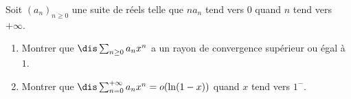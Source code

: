 \documentclass[a4paper,10pt]{report}
\begin{document}

\begin{Exercice}{} Soit $(a_n)_{n \geq 0}$ une suite de réels telle que $na_n$ tend vers $0$ quand $n$ tend vers $+ \infty$.
\begin{enumerate}
\item Montrer que $\dis \sum_{n \geq 0} a_n x^n$ a un rayon de convergence supérieur ou égal à $1$.
\item Montrer que $\dis \sum_{n=0}^{+ \infty} a_n x^n = o(\ln(1-x))$ quand $x$ tend vers $1^{-}$.
\end{enumerate}
\end{Exercice}
\end{document}
